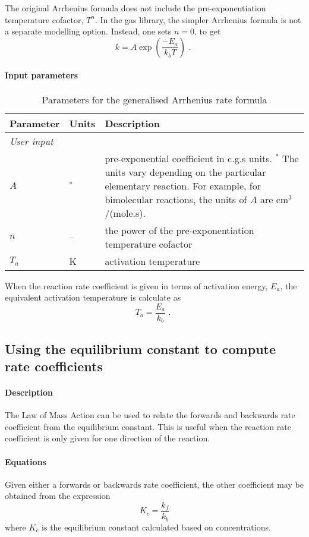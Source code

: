 The original Arrhenius formula does not include the pre-exponentiation
temperature cofactor, $T^n$.
In the gas library, the simpler Arrhenius formula is not
a separate modelling option.
Instead, one sets $n = 0$, to get
\begin{equation}
k = A \exp{\left( \frac{-E_a}{k_bT}\right)} \text{ . }
\end{equation}

\paragraph{Input parameters}

\begin{table}[h!]
\caption{Parameters for the generalised Arrhenius rate formula}
\label{tab:ga-formula}
\begin{tabular}{llp{10cm}}
\toprule
Parameter & Units & Description \\ \midrule
\multicolumn{3}{l}{\textit{User input}} \\
$A$       & ${}^*$ & pre-exponential coefficient in c.g.s units.
                    ${}^*$ The units vary depending on the particular
                    elementary reaction. For example, for bimolecular reactions,
                    the units of $A$ are cm$^3$/(mole.s). \\
$n$       &  --    & the power of the pre-exponentiation temperature cofactor \\
$T_a$     & K      & activation temperature \\
\bottomrule
\end{tabular}
\end{table}
When the reaction rate coefficient is given in terms
of activation energy, $E_a$, the equivalent activation
temperature is calculate as
\[ T_a = \frac{E_a}{k_b} \text{ . } \]


\subsection{Using the equilibrium constant to compute rate coefficients}
\paragraph{Description}
The Law of Mass Action can be used to relate the forwards
and backwards rate coefficient from the equilibrium constant.
This is useful when the reaction rate coefficient
is only given for one direction of the reaction.

\paragraph{Equations}
Given either a forwards or backwards rate coefficient, the
other coefficient may be obtained from the expression
\begin{equation}
K_c = \frac{k_f}{k_b}
\end{equation}
where $K_c$ is the equilibrium constant calculated based
on concentrations.

